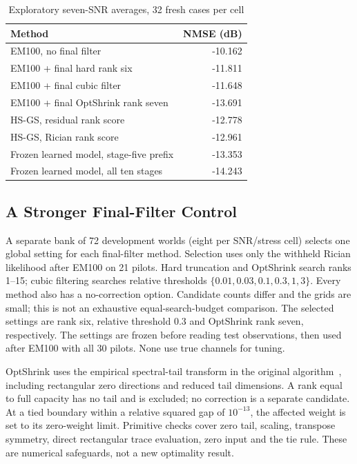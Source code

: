 \begin{table}[!t]
\caption{Exploratory seven-SNR averages, 32 fresh cases per cell}
\centering\small
\begin{tabular}{@{}lr@{}}\toprule
Method & NMSE (dB)\\\midrule

EM100, no final filter & -10.162\\

EM100 + final hard rank six & -11.811\\

EM100 + final cubic filter & -11.648\\

EM100 + final OptShrink rank seven & -13.691\\

HS-GS, residual rank score & -12.778\\

HS-GS, Rician rank score & -12.961\\

Frozen learned model, stage-five prefix & -13.353\\

Frozen learned model, all ten stages & -14.243\\

\bottomrule\end{tabular}
\end{table}

\subsection{A Stronger Final-Filter Control}
A separate bank of 72 development worlds (eight per SNR/stress cell) selects
one global setting for each final-filter method. Selection uses only the
withheld Rician likelihood after EM100 on 21 pilots. Hard truncation and
OptShrink search ranks 1--15; cubic filtering searches relative thresholds
$\{0.01,0.03,0.1,0.3,1,3\}$. Every method also has a no-correction option.
Candidate counts differ and the grids are small; this is not an exhaustive
equal-search-budget comparison. The selected settings are rank six,
relative threshold 0.3 and OptShrink rank seven, respectively. The
settings are frozen before reading test observations, then used after
EM100 with all 30 pilots. None use true channels for tuning.

OptShrink uses the empirical spectral-tail transform in the original
algorithm~\cite{nadakuditi2014}, including rectangular zero directions and
reduced tail dimensions. A rank equal to full capacity has no tail and
is excluded; no correction is a separate candidate. At a tied boundary
within a relative squared gap of $10^{-13}$, the affected weight is set
to its zero-weight limit. Primitive checks cover zero tail, scaling,
transpose symmetry, direct rectangular trace evaluation, zero input and
the tie rule. These are numerical safeguards, not a new optimality result.

